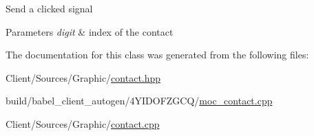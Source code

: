 Send a clicked signal 
\begin{DoxyParams}{Parameters}
{\em digit} & index of the contact \\
\hline
\end{DoxyParams}


The documentation for this class was generated from the following files\+:\begin{DoxyCompactItemize}
\item 
Client/\+Sources/\+Graphic/\hyperlink{contact_8hpp}{contact.\+hpp}\item 
build/babel\+\_\+client\+\_\+autogen/4\+Y\+I\+D\+O\+F\+Z\+G\+C\+Q/\hyperlink{build_2babel__client__autogen_24YIDOFZGCQ_2moc__contact_8cpp}{moc\+\_\+contact.\+cpp}\item 
Client/\+Sources/\+Graphic/\hyperlink{contact_8cpp}{contact.\+cpp}\end{DoxyCompactItemize}
